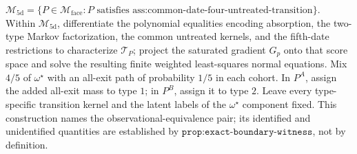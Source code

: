 \(\mathcal M_{\mathrm{5d}}=\{P\in\mathcal M_{\mathrm{face}}:P\text{ satisfies }\text{ass:common-date-four-untreated-transition}\}\).
Within \(\mathcal M_{\mathrm{5d}}\), differentiate the polynomial equalities encoding absorption, the two-type Markov factorization, the common untreated kernels, and the fifth-date restrictions to characterize \(\mathcal T_P\); project the saturated gradient \(G_p\) onto that score space and solve the resulting finite weighted least-squares normal equations.
Mix \(4/5\) of \(\omega^\star\) with an all-exit path of probability \(1/5\) in each cohort.  In \(P^A\), assign the added all-exit mass to type \(1\); in \(P^B\), assign it to type \(2\).  Leave every type-specific transition kernel and the latent labels of the \(\omega^\star\) component fixed.  This construction names the observational-equivalence pair; its identified and unidentified quantities are established by \(\texttt{prop:exact-boundary-witness}\), not by definition.
